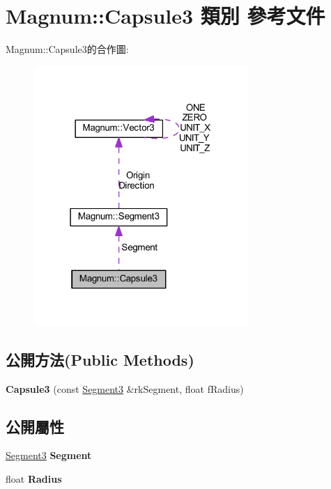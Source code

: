 \hypertarget{class_magnum_1_1_capsule3}{}\section{Magnum\+:\+:Capsule3 類別 參考文件}
\label{class_magnum_1_1_capsule3}


Magnum\+:\+:Capsule3的合作圖\+:\nopagebreak
\begin{figure}[H]
\begin{center}
\leavevmode
\includegraphics[width=231pt]{class_magnum_1_1_capsule3__coll__graph}
\end{center}
\end{figure}
\subsection*{公開方法(Public Methods)}
\begin{DoxyCompactItemize}
\item 
{\bfseries Capsule3} (const \hyperlink{class_magnum_1_1_segment3}{Segment3} \&rk\+Segment, float f\+Radius)\hypertarget{class_magnum_1_1_capsule3_ad4f6700cfc90c1843440112a5c2df7cb}{}\label{class_magnum_1_1_capsule3_ad4f6700cfc90c1843440112a5c2df7cb}

\end{DoxyCompactItemize}
\subsection*{公開屬性}
\begin{DoxyCompactItemize}
\item 
\hyperlink{class_magnum_1_1_segment3}{Segment3} {\bfseries Segment}\hypertarget{class_magnum_1_1_capsule3_a286f16af165df893dfeb478772b1ef4f}{}\label{class_magnum_1_1_capsule3_a286f16af165df893dfeb478772b1ef4f}

\item 
float {\bfseries Radius}\hypertarget{class_magnum_1_1_capsule3_aecdf6fb3cbd757adb921971cd08fcacf}{}\label{class_magnum_1_1_capsule3_aecdf6fb3cbd757adb921971cd08fcacf}

\end{DoxyCompactItemize}


